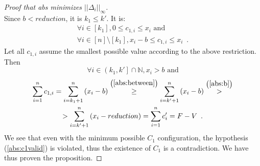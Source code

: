 \begin{proof}[Proof that abs minimizes $||\Delta_i||_{\infty}$]
\begin{equation*}
  \end{equation*}
  Since $b < reduction$, it is $k_1 \leq k'$. It is:
  \begin{equation*}
  \begin{gathered}
    \forall i \in [k_1], 0 \leq c_{1, i} \leq x_i \mbox{ and} \\
    \forall i \in [n] \setminus [k_1], x_i - b \leq c_{1, i} \leq x_i \enspace.
  \end{gathered}
  \end{equation*}
  Let all $c_{1, i}$ assume the smallest possible value according to the above restriction. Then
  \begin{equation}
  \label{abs:between}
    \forall i \in \left(k_1, k'\right] \cap \mathbb{N}, x_i > b \mbox{ and}
  \end{equation}
  \begin{equation*}
  \begin{gathered}
    \sum\limits_{i=1}^nc_{1, i} = \sum\limits_{i=k_1+1}^n\left(x_i - b\right) \overset{\left(\ref{abs:between}\right)}{\geq}
    \sum\limits_{i=k'+1}^n\left(x_i - b\right) \overset{\left(\ref{abs:b}\right)}{>} \\
    > \sum\limits_{i=k'+1}^n\left(x_i - reduction\right) = \sum\limits_{i=1}^nc'_i = F - V \enspace.
  \end{gathered}
  \end{equation*}
  We see that even with the minimum possible $C_1$ configuration, the hypothesis (\ref{abs:c1valid}) is violated, thus the
  existence of $C_1$ is a contradiction. We have thus proven the proposition.
\end{proof}
